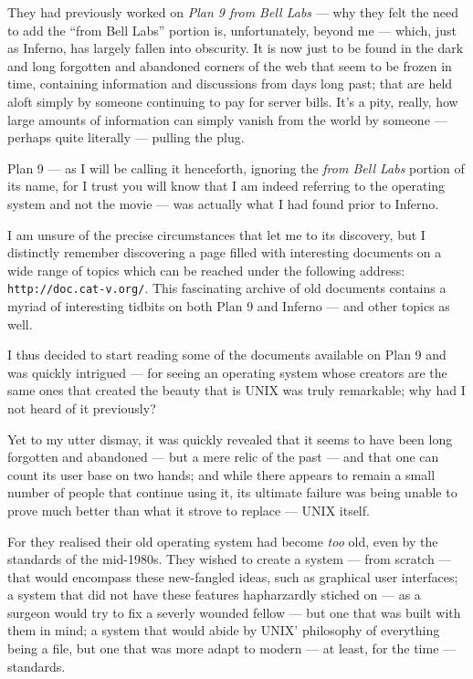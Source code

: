 \documentclass[a4paper,12pt]{report}
\begin{document}
They had previously worked on \textit{Plan 9 from Bell Labs} — why they felt the need to add the ``from Bell Labs'' portion is, unfortunately, beyond me — which, just as Inferno, has largely fallen into obscurity. It is now just to be found in the dark and long forgotten and abandoned corners of the web that seem to be frozen in time, containing information and discussions from days long past; that are held aloft simply by someone continuing to pay for server bills. It's a pity, really, how large amounts of information can simply vanish from the world by someone — perhaps quite literally — pulling the plug.

Plan 9 — as I will be calling it henceforth, ignoring the \textit{from Bell Labs} portion of its name, for I trust you will know that I am indeed referring to the operating system and not the movie — was actually what I had found prior to Inferno.

I am unsure of the precise circumstances that let me to its discovery, but I distinctly remember discovering a page filled with interesting documents on a wide range of topics which can be reached under the following address: \texttt{http://doc.cat-v.org/}. 
This fascinating archive of old documents contains a myriad of interesting tidbits on both Plan 9 and Inferno — and other topics as well. 

I thus decided to start reading some of the documents available on Plan 9 and was quickly intrigued — for seeing an operating system whose creators are the same ones that created the beauty that is UNIX was truly remarkable; why had I not heard of it previously?

Yet to my utter dismay, it was quickly revealed that it seems to have been long forgotten and abandoned — but a mere relic of the past — and that one can count its user base on two hands; and while there appears to remain a small number of people that continue using it, its ultimate failure was being unable to prove much better than what it strove to replace — UNIX itself.

For they realised their old operating system had become \textit{too} old, even by the standards of the mid-1980s. They wished to create a system — from scratch — that would encompass these new-fangled ideas, such as graphical user interfaces; a system that did not have these features hapharzardly stiched on — as a surgeon would try to fix a severly wounded fellow — but one that was built with them in mind; a system that would abide by UNIX' philosophy of everything being a file, but one that was more adapt to modern — at least, for the time — standards.
\end{document}
